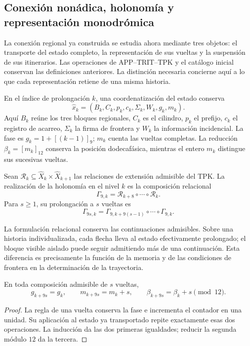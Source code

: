 \subsection{Conexión nonádica, holonomía y representación monodrómica}
\label{mono-ampl:conexion}

La conexión regional ya construida se estudia ahora mediante tres objetos:
el transporte del estado completo, la representación de sus vueltas y la
suspensión de sus itinerarios. Las operaciones de APP--TRIT--TPK y el
catálogo inicial conservan las definiciones anteriores. La distinción
necesaria concierne aquí a lo que cada representación retiene de una
misma historia.

En el índice de prolongación \(k\), una coordenatización del estado conserva
\[
 \widehat x_k=(B_k,C_k,p_k,c_k,\Sigma_k,W_k,g_k,m_k).
\]
Aquí \(B_k\) reúne los tres bloques regionales, \(C_k\) es el cilindro,
\(p_k\) el prefijo, \(c_k\) el registro de acarreo, \(\Sigma_k\) la firma
de frontera y \(W_k\) la información incidencial. La fase es
\(g_k=1+[(k-1)]_9\); \(m_k\) cuenta las vueltas completas. La reducción
\(\beta_k=[m_k]_{12}\) conserva la posición dodecafásica, mientras el
entero \(m_k\) distingue sus sucesivas vueltas.

\begin{definition}
\label{mono-ampl:def-vuelta}
Sean \(\mathcal R_k\subseteq\widehat X_k\times\widehat X_{k+1}\)
las relaciones de extensión admisible del TPK. La realización de la
holonomía en el nivel \(k\) es la composición relacional
\[
 \Gamma_{9,k}=\mathcal R_{k+8}\circ\cdots\circ\mathcal R_k.
\]
Para \(s\geq1\), su prolongación a \(s\) vueltas es
\[
 \Gamma_{9s,k}=
 \Gamma_{9,k+9(s-1)}\circ\cdots\circ\Gamma_{9,k}.
\]
\end{definition}

La formulación relacional conserva las continuaciones admisibles. Sobre
una historia individualizada, cada flecha lleva al estado efectivamente
prolongado; el bloque visible aislado puede seguir admitiendo más de una
continuación. Esta diferencia es precisamente la función de la memoria y
de las condiciones de frontera en la determinación de la trayectoria.

\begin{proposition}
\label{mono-ampl:vueltas}
En toda composición admisible de \(s\) vueltas,
\[
 g_{k+9s}=g_k,\qquad m_{k+9s}=m_k+s,\qquad
 \beta_{k+9s}=\beta_k+s\pmod{12}.
\]
\end{proposition}
\begin{proof}
La regla de una vuelta conserva la fase e incrementa el contador en una
unidad. Su aplicación al estado ya transportado repite exactamente esas
dos operaciones. La inducción da las dos primeras igualdades; reducir la
segunda módulo \(12\) da la tercera.
\end{proof}

